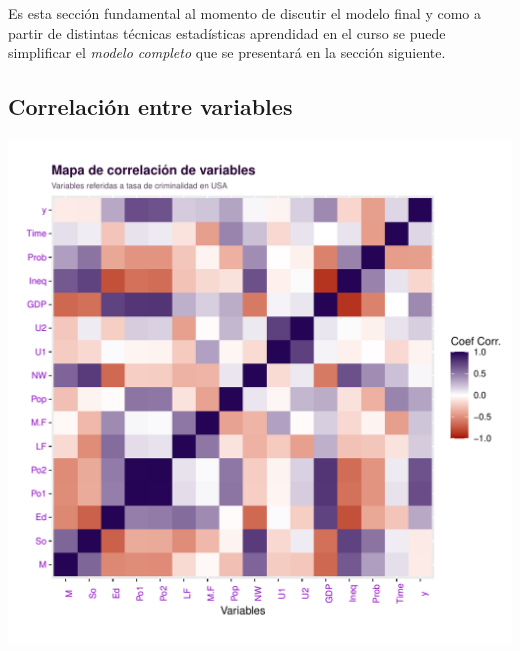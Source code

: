 \documentclass[11pt,a4paper]{article}\usepackage[]{graphicx}\usepackage[]{color}
\makeatletter
\def\maxwidth{ %
  \ifdim\Gin@nat@width>\linewidth
    \linewidth
  \else
    \Gin@nat@width
  \fi
}
\newenvironment{knitrout}{}{} %
\makeatother
\begin{document}
Es esta sección fundamental al momento de discutir el modelo final y como a partir de distintas técnicas estadísticas aprendidad en el curso se puede simplificar el \textit{modelo completo} que se presentará en la sección siguiente.

\subsection{Correlación entre variables}

\begin{knitrout}
\color{fgcolor}
\includegraphics[width=\maxwidth]{figure/unnamed-chunk-2-1} 

\end{knitrout}
\end{document}
